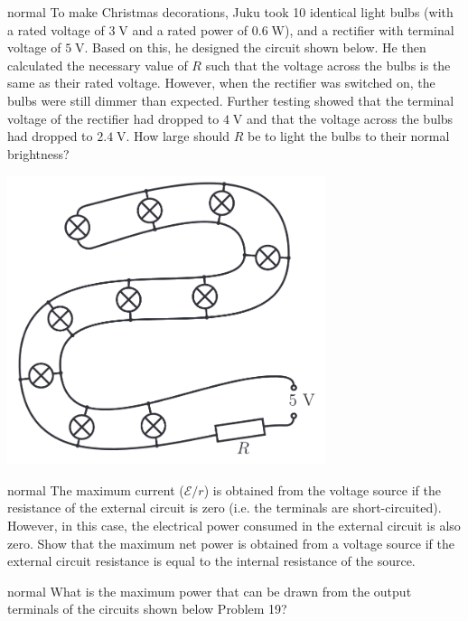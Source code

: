 \hypertarget{P16}{}
\begin{solution}{normal} %
To make Christmas decorations, Juku took 10 identical light bulbs (with a rated voltage of $3\;\text{V}$ and a rated power of $0.6\;\text{W}$), and a rectifier with terminal voltage of $5\;\text{V}$. Based on this, he designed the circuit shown below. He then calculated the necessary value of $R$ such that the voltage across the bulbs is the same as their rated voltage. However, when the rectifier was switched on, the bulbs were still dimmer than expected. Further testing showed that the terminal voltage of the rectifier had dropped to $4\;\text{V}$ and that the voltage across the bulbs had dropped to $2.4\;\text{V}$. How large should $R$ be to light the bulbs to their normal brightness?
\begin{center}
    \includegraphics[width=0.7\textwidth]{S1 Figures/S1-16.png}
\end{center}
\end{solution}

\hypertarget{P17}{}
\begin{solution}{normal} %
The maximum current ($\mathcal{E}/r$) is obtained from the voltage source if the resistance of the external circuit is zero (i.e. the terminals are short-circuited). However, in this case, the electrical power consumed in the external circuit is also zero. Show that the maximum net power is obtained from a voltage source if the external circuit resistance is equal to the internal resistance of the source.
\end{solution}

\hypertarget{P18}{}
\begin{solution}{normal} %
What is the maximum power that can be drawn from the output terminals of the circuits shown below Problem 19?
\end{solution}

